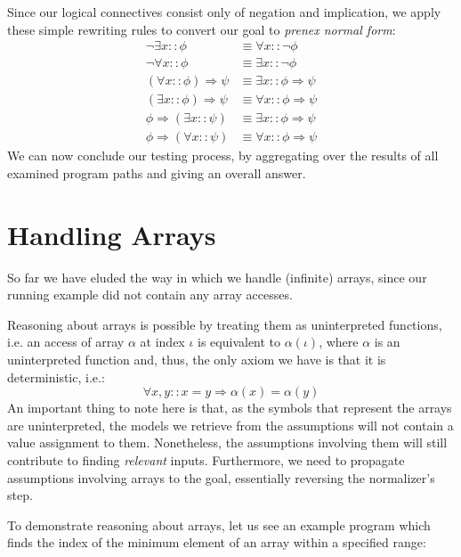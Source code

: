 \documentclass[nonatbib,numbers,10pt]{sigplanconf}
\begin{document}
Since our logical connectives consist only of negation and implication, we apply these simple rewriting rules to convert our goal to \textit{prenex normal form}:
\begin{align*}
\neg \exists x :: \phi &\equiv \forall x :: \neg \phi \\
\neg \forall x :: \phi &\equiv \exists x :: \neg \phi \\
(\forall x :: \phi) \Rightarrow \psi &\equiv \exists x :: \phi \Rightarrow \psi \\
(\exists x :: \phi) \Rightarrow \psi &\equiv \forall x :: \phi \Rightarrow \psi \\
\phi \Rightarrow (\exists x :: \psi) &\equiv \exists x :: \phi \Rightarrow \psi \\
\phi \Rightarrow (\forall x :: \psi) &\equiv \forall x :: \phi \Rightarrow \psi
\end{align*}
We can now conclude our testing process, by aggregating over the results of all examined program paths and giving an overall answer.

\section{Handling Arrays}
So far we have eluded the way in which we handle (infinite) arrays, since our running example did not contain any array accesses.

Reasoning about arrays is possible by treating them as uninterpreted functions, i.e. an access of array $\alpha$ at index $\iota$ is equivalent to $\alpha(\iota)$, where $\alpha$ is an uninterpreted function and, thus, the only axiom we have is that it is deterministic, i.e.:
\begin{equation*}
\forall x,y :: x = y \Rightarrow \alpha(x) = \alpha(y)
\end{equation*}
An important thing to note here is that, as the symbols that represent the arrays are uninterpreted, the models we retrieve from the assumptions will not contain a value assignment to them. Nonetheless, the assumptions involving them will still contribute to finding \textit{relevant} inputs. Furthermore, we need to propagate assumptions involving arrays to the goal, essentially reversing the normalizer's step.

To demonstrate reasoning about arrays, let us see an example program which finds the index of the minimum element of an array within a specified range:

\end{document}
